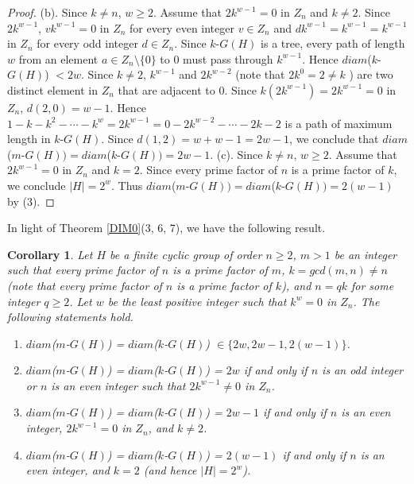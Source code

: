 \documentclass{amsart}
\theoremstyle{plain}
\newtheorem{cor}[thm]{Corollary}
\begin{document}
\begin{proof}
				\newline
				(b). Since $k \not = n$, $w\geq 2$. Assume that $2k^{w-1} = 0$ in $Z_n$ and $k \not = 2$. Since $2k^{w-1}$, $vk^{w-1} = 0$ in $Z_n$ for every even integer $v \in Z_n$ and $dk^{w-1} = k^{w-1} = k^{w-1}$ in $Z_n$ for every odd integer $d\in Z_n$. Since $k$-$G(H)$ is a tree, every path of length $w$ from an element $a\in Z_n\setminus \{0\}$ to $0$ must pass through $k^{w-1}$. Hence $diam$($k$-$G(H)$) $ <  2w$. Since $k \not = 2$, $k^{w-1}$ and $2k^{w-2}$ (note that $2k^0 = 2 \not = k$ ) are two distinct element in $Z_n$ that are adjacent to $0$. Since $k(2k^{w-1}) = 2k^{w-1} = 0$ in $Z_n$, $d(2, 0) = w-1$. Hence $1-k-k^2-\cdots - k^w=2k^{w-1} = 0-2k^{w-2}-\cdots -2k-2$ is a path of maximum length in $k$-$G(H)$. Since $d(1, 2) = w + w-1 = 2w - 1$, we conclude that $diam$($m$-$G(H)) = diam$($k$-$G(H)) = 2w -1$.
				\newline
				(c). Since $k \not = n$, $w\geq 2$. Assume that $2k^{w-1} = 0$ in $Z_n$ and $k = 2$. Since every prime factor of $n$ is a prime factor of $k$, we conclude $|H| = 2^w$. Thus $diam$($m$-$G(H)) = diam$($k$-$G(H)) = 2(w - 1)$ by (3).
		\end{proof}
In light of Theorem \ref{DIM0}(3, 6, 7), we have the following
result.
\begin{cor}\label{C3}
	Let $H$ be a finite cyclic group of order $n \geq 2$, $m > 1$ be an integer such that every prime factor of $n$ is a prime factor of $m$,  $k = gcd(m, n)\not = n$ (note that every prime factor of $n$ is a prime factor of $k$), and $n = qk$ for some integer $q \geq 2$. Let $w$ be the least positive integer such that $k^w = 0$ in $Z_n$. The following statements hold.		

	\begin{enumerate}
		\item $diam$($m$-$G(H)$) = $diam$($k$-$G(H)$) $\in \{2w, 2w - 1, 2(w-1)\}$.
		
		\item $diam$($m$-$G(H)$) = $diam$($k$-$G(H)$) = $2w$ if and only if $n$ is an odd integer or $n$ is an even integer such that $2k^{w-1} \not = 0$ in $Z_n$.
		\item $diam$($m$-$G(H)$) = $diam$($k$-$G(H)$) = $2w - 1$ if and only if $n$ is an even integer, $2k^{w-1} = 0$ in $Z_n$, and $k \not = 2$.
		\item $diam$($m$-$G(H)$) = $diam$($k$-$G(H)$) = $2(w - 1)$ if and only if $n$ is an even integer, and $k = 2$ (and hence $|H| = 2^w$).
	\end{enumerate}
	\end{cor}
\end{document}
